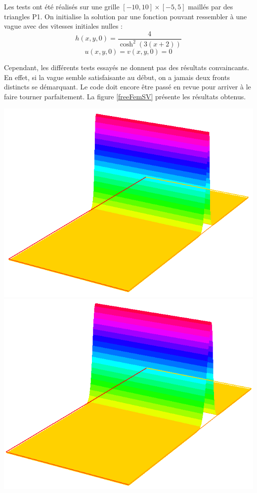 Les tests ont été réalisés sur une grille $[-10,10]\times[-5,5]$ maillés par des triangles P1. On initialise la solution par une fonction pouvant ressembler à une vague avec des vitesses initiales nulles :
	\[h(x,y,0)=\frac{4}{\cosh^2(3(x+2))}\]
	\[u(x,y,0)=v(x,y,0)=0\]

Cependant, les différents tests essayés ne donnent pas des résultats convaincants. En effet, si la vague semble satisfaisante au début, on a jamais deux fronts distincts se démarquant. Le code doit encore être passé en revue pour arriver à le faire tourner parfaitement. La figure \ref{freeFemSV} présente les résultats obtenus.

\includegraphics[scale=0.3]{images/capture1.png}
\includegraphics[scale=0.3]{images/capture2.png}\\
